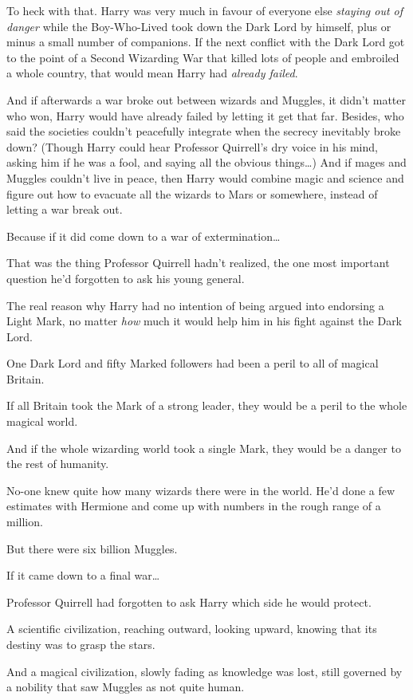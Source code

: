 To heck with that. Harry was very much in favour of everyone else \emph{staying out of danger} while the Boy-Who-Lived took down the Dark Lord by himself, plus or minus a small number of companions. If the next conflict with the Dark Lord got to the point of a Second Wizarding War that killed lots of people and embroiled a whole country, that would mean Harry had \emph{already failed}.

And if afterwards a war broke out between wizards and Muggles, it didn’t matter who won, Harry would have already failed by letting it get that far. Besides, who said the societies couldn’t peacefully integrate when the secrecy inevitably broke down? (Though Harry could hear Professor Quirrell’s dry voice in his mind, asking him if he was a fool, and saying all the obvious things…) And if mages and Muggles couldn’t live in peace, then Harry would combine magic and science and figure out how to evacuate all the wizards to Mars or somewhere, instead of letting a war break out.

Because if it did come down to a war of extermination…

That was the thing Professor Quirrell hadn’t realized, the one most important question he’d forgotten to ask his young general.

The real reason why Harry had no intention of being argued into endorsing a Light Mark, no matter \emph{how} much it would help him in his fight against the Dark Lord.

One Dark Lord and fifty Marked followers had been a peril to all of magical Britain.

If all Britain took the Mark of a strong leader, they would be a peril to the whole magical world.

And if the whole wizarding world took a single Mark, they would be a danger to the rest of humanity.

No-one knew quite how many wizards there were in the world. He’d done a few estimates with Hermione and come up with numbers in the rough range of a million.

But there were six billion Muggles.

If it came down to a final war…

Professor Quirrell had forgotten to ask Harry which side he would protect.

A scientific civilization, reaching outward, looking upward, knowing that its destiny was to grasp the stars.

And a magical civilization, slowly fading as knowledge was lost, still governed by a nobility that saw Muggles as not quite human.

